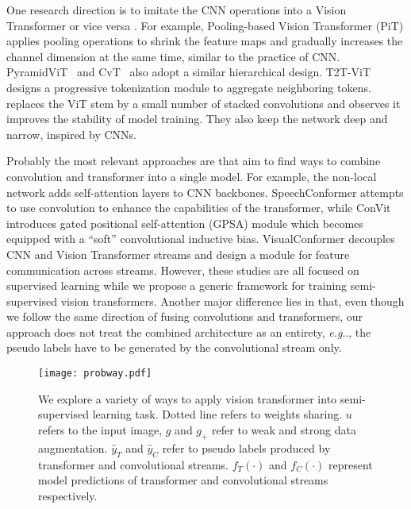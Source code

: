 \documentclass[runningheads]{llncs}
\makeatletter
\DeclareRobustCommand\onedot{\futurelet\@let@token\@onedot}
\def\@onedot{\ifx\@let@token.\else.\null\fi\xspace}
\def\eg{\emph{e.g}\onedot} \def\Eg{\emph{E.g}\onedot}
\makeatother
\begin{document}
One research direction is to imitate the CNN operations into a Vision Transformer or vice versa \cite{heo2021rethinking, yuan2021tokens, xiao2021early, wang2021pyramid}. For example, Pooling-based Vision Transformer (PiT) \cite{heo2021rethinking} applies pooling operations to shrink the feature maps and gradually increases the channel dimension at the same time, similar to the practice of CNN. PyramidViT~\cite{wang2021pyramid} and CvT~\cite{wu2021cvt} also adopt a similar hierarchical design. T2T-ViT \cite{yuan2021tokens} designs a progressive tokenization module to aggregate neighboring tokens. ~\cite{xiao2021early} replaces the ViT stem by a small number of stacked convolutions and observes it improves the stability of model training. They also keep the network deep and narrow, inspired by CNNs.

Probably the most relevant approaches are \cite{wang2018non, d2021convit, gulati2020conformer, peng2021conformer} that aim to find ways to combine convolution and transformer into a single model. For example, the non-local network \cite{wang2018non} adds self-attention layers to CNN backbones. SpeechConformer \cite{gulati2020conformer} attempts to use convolution to enhance the capabilities of the transformer, while ConVit \cite{d2021convit} introduces gated positional self-attention (GPSA) module which becomes equipped with a ``soft'' convolutional inductive bias. VisualConformer \cite{peng2021conformer} decouples CNN and Vision Transformer streams and design a module for feature communication across streams. However, these studies are all focused on supervised learning while we propose a generic framework for training semi-supervised vision transformers. Another major difference lies in that, even though we follow the same direction of fusing convolutions and transformers, our approach does not treat the combined architecture as an entirety, \eg, the pseudo labels have to be generated by the convolutional stream only.






\begin{figure*}[t]
\centering
\texttt{[image: probway.pdf]}
  \caption{We explore a variety of ways to apply vision transformer into semi-supervised learning task. Dotted line refers to weights sharing. $u$ refers to the input image, $g$ and $g_{+}$ refer to weak and strong data augmentation. $\hat{y}_T$ and $\hat{y}_C$ refer to pseudo labels produced by transformer and convolutional streams. $f_T(\cdot)$ and $f_C(\cdot)$ represent model predictions of transformer and convolutional streams respectively.}
\label{fig:study}
\end{figure*}
\end{document}
